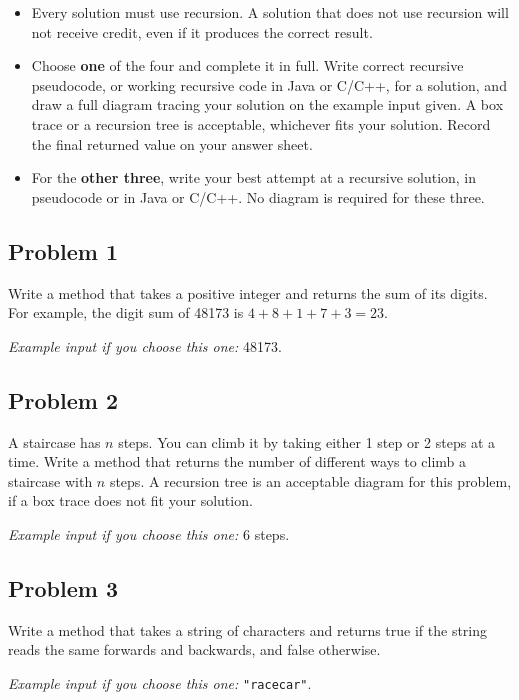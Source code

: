 \documentclass[11pt]{article}
\begin{document}
\begin{itemize}[leftmargin=1.4em]
  \item Every solution must use recursion. A solution that does not use
        recursion will not receive credit, even if it produces the correct
        result.
  \item Choose \textbf{one} of the four and complete it in full. Write
        correct recursive pseudocode, or working recursive code in Java or
        C/C++, for a solution, and draw a full diagram tracing your
        solution on the example input given. A box trace or a recursion
        tree is acceptable, whichever fits your solution. Record the final
        returned value on your answer sheet.
  \item For the \textbf{other three}, write your best attempt at a
        recursive solution, in pseudocode or in Java or C/C++. No diagram
        is required for these three.
\end{itemize}

\subsection{Problem 1}
Write a method that takes a positive integer and returns the sum of its
digits. For example, the digit sum of 48173 is $4+8+1+7+3 = 23$.

\vspace{4pt}\noindent\textit{Example input if you choose this one:} 48173.

\subsection{Problem 2}
A staircase has $n$ steps. You can climb it by taking either 1 step or 2
steps at a time. Write a method that returns the number of different ways
to climb a staircase with $n$ steps. A recursion tree is an acceptable
diagram for this problem, if a box trace does not fit your solution.

\vspace{4pt}\noindent\textit{Example input if you choose this one:} 6 steps.

\subsection{Problem 3}
Write a method that takes a string of characters and returns true if the
string reads the same forwards and backwards, and false otherwise.

\vspace{4pt}\noindent\textit{Example input if you choose this one:} \texttt{"racecar"}.
\end{document}
